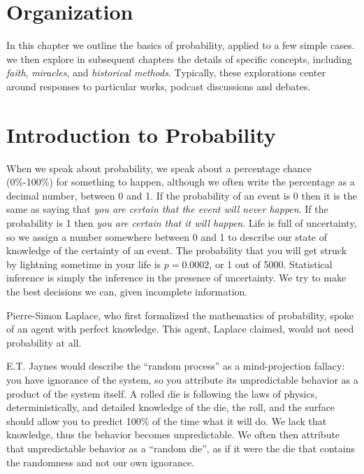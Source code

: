 \section{Organization}

In this chapter we outline the basics of probability, applied to a few simple cases.  we then explore in subsequent chapters the details of specific concepts, including {\em faith}, {\em miracles}, and {\em historical methods}.  Typically, these explorations center around responses to particular works, podcast discussions and debates.  


\section{Introduction to Probability}

When we speak about probability, we speak about a percentage chance (0\%-100\%) for something to happen, although we often write the percentage as a decimal number, between 0 and 1.  If the  probability of an event is 0 then it is the same as saying that {\em you are certain that the event will never happen}.  If the probability is 1 then {\em you are certain that it {\em will} happen}.  Life is full of uncertainty, so we assign a number somewhere between 0 and 1 to describe our state of knowledge of the certainty of an event. The probability that you will get struck by lightning sometime in your life is $p=0.0002$, or 1 out of 5000. Statistical inference is simply the inference in the presence of uncertainty.  We try to make the best decisions we can, given incomplete information.  

Pierre-Simon Laplace, who first formalized the mathematics of probability, spoke of an agent with perfect knowledge.  This agent, Laplace claimed, would not need probability at all.

E.T. Jaynes would describe the ``random process'' as a mind-projection fallacy\cite{Jaynes2003}: you have ignorance of the system, so you attribute its unpredictable behavior as a product of the system itself. A rolled die is following the laws of physics, deterministically, and detailed knowledge of the die, the roll, and the surface should allow you to predict 100\% of the time what it will do.  We lack that knowledge, thus the behavior becomes unpredictable. We often then attribute that unpredictable behavior as a ``random die'', as if it were the die that contains the randomness and not our own ignorance.


